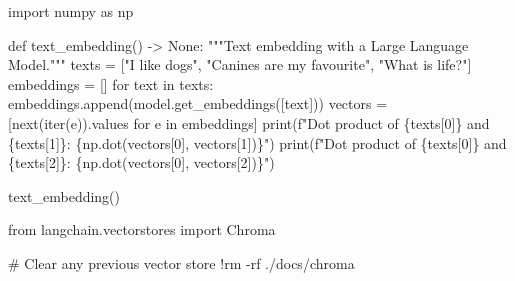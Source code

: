 \documentclass[
  letterpaper,
  DIV=11,
  numbers=noendperiod]{scrreprt}
\newenvironment{Shaded}{\begin{snugshade}}{\end{snugshade}}
\newcommand{\BuiltInTok}[1]{\textcolor[rgb]{0.00,0.23,0.31}{#1}}
\newcommand{\CommentTok}[1]{\textcolor[rgb]{0.37,0.37,0.37}{#1}}
\newcommand{\ControlFlowTok}[1]{\textcolor[rgb]{0.00,0.23,0.31}{#1}}
\newcommand{\DecValTok}[1]{\textcolor[rgb]{0.68,0.00,0.00}{#1}}
\newcommand{\ImportTok}[1]{\textcolor[rgb]{0.00,0.46,0.62}{#1}}
\newcommand{\KeywordTok}[1]{\textcolor[rgb]{0.00,0.23,0.31}{#1}}
\newcommand{\NormalTok}[1]{\textcolor[rgb]{0.00,0.23,0.31}{#1}}
\newcommand{\OperatorTok}[1]{\textcolor[rgb]{0.37,0.37,0.37}{#1}}
\newcommand{\SpecialCharTok}[1]{\textcolor[rgb]{0.37,0.37,0.37}{#1}}
\newcommand{\SpecialStringTok}[1]{\textcolor[rgb]{0.13,0.47,0.30}{#1}}
\newcommand{\StringTok}[1]{\textcolor[rgb]{0.13,0.47,0.30}{#1}}
\newcommand{\VariableTok}[1]{\textcolor[rgb]{0.07,0.07,0.07}{#1}}
\begin{document}
\begin{Shaded}
\begin{Highlighting}[]
\ImportTok{import}\NormalTok{ numpy }\ImportTok{as}\NormalTok{ np}

\KeywordTok{def}\NormalTok{ text\_embedding() }\OperatorTok{{-}\textgreater{}} \VariableTok{None}\NormalTok{:}
    \CommentTok{"""Text embedding with a Large Language Model."""}
\NormalTok{    texts }\OperatorTok{=}\NormalTok{ [}\StringTok{"I like dogs"}\NormalTok{, }\StringTok{"Canines are my favourite"}\NormalTok{, }\StringTok{"What is life?"}\NormalTok{]}
\NormalTok{    embeddings }\OperatorTok{=}\NormalTok{ []}
    \ControlFlowTok{for}\NormalTok{ text }\KeywordTok{in}\NormalTok{ texts:}
\NormalTok{      embeddings.append(model.get\_embeddings([text]))}
\NormalTok{    vectors }\OperatorTok{=}\NormalTok{ [}\BuiltInTok{next}\NormalTok{(}\BuiltInTok{iter}\NormalTok{(e)).values }\ControlFlowTok{for}\NormalTok{ e }\KeywordTok{in}\NormalTok{ embeddings]}
    \BuiltInTok{print}\NormalTok{(}\SpecialStringTok{f"Dot product of \textquotesingle{}}\SpecialCharTok{\{}\NormalTok{texts[}\DecValTok{0}\NormalTok{]}\SpecialCharTok{\}}\SpecialStringTok{\textquotesingle{} and \textquotesingle{}}\SpecialCharTok{\{}\NormalTok{texts[}\DecValTok{1}\NormalTok{]}\SpecialCharTok{\}}\SpecialStringTok{\textquotesingle{}: }\SpecialCharTok{\{}\NormalTok{np}\SpecialCharTok{.}\NormalTok{dot(vectors[}\DecValTok{0}\NormalTok{], vectors[}\DecValTok{1}\NormalTok{])}\SpecialCharTok{\}}\SpecialStringTok{"}\NormalTok{)}
    \BuiltInTok{print}\NormalTok{(}\SpecialStringTok{f"Dot product of \textquotesingle{}}\SpecialCharTok{\{}\NormalTok{texts[}\DecValTok{0}\NormalTok{]}\SpecialCharTok{\}}\SpecialStringTok{\textquotesingle{} and \textquotesingle{}}\SpecialCharTok{\{}\NormalTok{texts[}\DecValTok{2}\NormalTok{]}\SpecialCharTok{\}}\SpecialStringTok{\textquotesingle{}: }\SpecialCharTok{\{}\NormalTok{np}\SpecialCharTok{.}\NormalTok{dot(vectors[}\DecValTok{0}\NormalTok{], vectors[}\DecValTok{2}\NormalTok{])}\SpecialCharTok{\}}\SpecialStringTok{"}\NormalTok{)}
\end{Highlighting}
\end{Shaded}

\begin{Shaded}
\begin{Highlighting}[]
\NormalTok{text\_embedding()}
\end{Highlighting}
\end{Shaded}

\begin{Shaded}
\begin{Highlighting}[]
\ImportTok{from}\NormalTok{ langchain.vectorstores }\ImportTok{import}\NormalTok{ Chroma}

\CommentTok{\# Clear any previous vector store}
\OperatorTok{!}\NormalTok{rm }\OperatorTok{{-}}\NormalTok{rf .}\OperatorTok{/}\NormalTok{docs}\OperatorTok{/}\NormalTok{chroma}
\end{Highlighting}
\end{Shaded}
\end{document}
